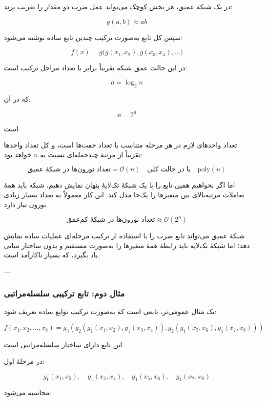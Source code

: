 \documentclass[12pt,a4paper]{article}
\begin{document}
در یک شبکهٔ عمیق، هر بخش کوچک می‌تواند عمل ضرب دو مقدار را تقریب بزند:

\[
g(a,b)\approx ab
\]

سپس کل تابع به‌صورت ترکیب چندین تابع ساده نوشته می‌شود:

\[
f(x)
=
g
\Big(
g(x_1,x_2),
g(x_3,x_4),
\ldots
\Big)
\]

در این حالت عمق شبکه تقریباً برابر با تعداد مراحل ترکیب است:

\[
d = \log_2 n
\]

که در آن:

\[
n=2^d
\]

است.

تعداد واحدهای لازم در هر مرحله متناسب با تعداد جفت‌ها است، و کل تعداد واحدها تقریباً از مرتبهٔ چندجمله‌ای نسبت به \(n\) خواهد بود:

\[
\text{تعداد نورون‌ها در شبکهٔ عمیق}
=
\mathcal{O}(n)
\quad
\text{یا در حالت کلی}
\quad
\mathrm{poly}(n)
\]

اما اگر بخواهیم همین تابع را با یک شبکهٔ تک‌لایهٔ پنهان نمایش دهیم، شبکه باید همهٔ تعاملات مرتبه‌بالای بین متغیرها را یک‌جا مدل کند. این کار معمولاً به تعداد بسیار زیادی نورون نیاز دارد.

\[
\text{تعداد نورون‌ها در شبکهٔ کم‌عمق}
\approx
\mathcal{O}(2^n)
\]

\begin{tcolorbox}[
	colback=softgreen,
	colframe=mygreen,
	title=مزیت عمق در تابع ضرب
	]
	شبکهٔ عمیق می‌تواند تابع ضرب را با استفاده از ترکیب مرحله‌ای عملیات ساده نمایش دهد؛ اما شبکهٔ تک‌لایه باید رابطهٔ همهٔ متغیرها را به‌صورت مستقیم و بدون ساختار میانی یاد بگیرد، که بسیار ناکارآمد است.
\end{tcolorbox}

---

\subsubsection{مثال دوم: تابع ترکیبی سلسله‌مراتبی}

یک مثال عمومی‌تر، تابعی است که به‌صورت ترکیب توابع ساده تعریف شود:

\[
f(x_1,x_2,\ldots,x_8)
=
g_3
\left(
g_2(g_1(x_1,x_2),g_1(x_3,x_4)),
g_2(g_1(x_5,x_6),g_1(x_7,x_8))
\right)
\]

این تابع دارای ساختار سلسله‌مراتبی است.

در مرحلهٔ اول:

\[
g_1(x_1,x_2),
\quad
g_1(x_3,x_4),
\quad
g_1(x_5,x_6),
\quad
g_1(x_7,x_8)
\]

محاسبه می‌شود.
\end{document}

